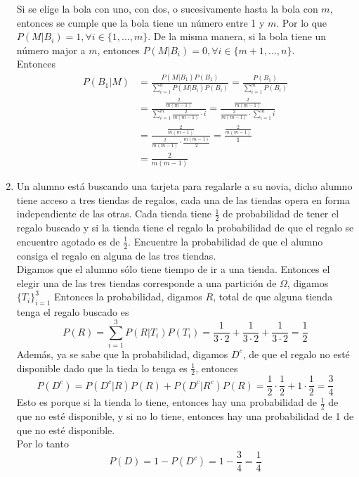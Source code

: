 \documentclass[12pt,a4paper]{report}
\begin{document}
\begin{enumerate}
{\begin{enumerate}[label= \alph*) ]
{		Si se elige la bola con uno, con dos, o sucesivamente hasta la bola con $m$,
		entonces se cumple que la bola tiene un número entre 1 y $m$. Por lo que
		$P(M|B_i) = 1, \forall i \in \{1, ..., m\}$. De la misma manera, si la bola
		tiene un número major a $m$, entonces $P(M|B_i) = 0, \forall i \in \{m+1, ..., n\}$.\\
		Entonces
		\begin{align*}
			P(B_1|M) &= \frac{P(M | B_1)P(B_1)}{\sum_{i = 1}^n P(M|B_i)P(B_i)}
							 = \frac{P(B_1)}{\sum_{i = 1}^m P(B_i)}\\
							 &= \frac{\frac{2}{m(m-1)}}{\sum_{i = 1}^m \frac{2}{m(m-1)}\cdot i}
							 = \frac{\frac{2}{m(m-1)}}{\frac{2}{m(m-1)} \cdot \sum_{i = 1}^m i}\\
							 &= \frac{\frac{2}{m(m-1)}}{\frac{2}{m(m-1)} \cdot \frac{m(m-1)}{2}}
							 = \frac{\frac{2}{m(m-1)}}{1}\\
							 &= \frac{2}{m(m-1)}
		\end{align*}
	}
 \end{enumerate}
  }

  \item{
		Un alumno está buscando una tarjeta para regalarle a su novia,
		dicho alumno tiene acceso a tres tiendas de regalos, cada una de las tiendas
		opera en forma independiente de las otras. Cada tienda tiene $\frac{1}{2}$
		de probabilidad de tener el regalo buscado y si la tienda tiene el regalo la
		probabilidad de que el regalo se encuentre agotado es de $\frac{1}{2}$.
		Encuentre la probabilidad de que el alumno consiga el regalo en alguna de
		las tres tiendas.\\

		Digamos que el alumno sólo tiene tiempo de ir a una tienda. Entonces el elegir
		una de las tres tiendas corresponde a una partición de $\Omega$, digamos $\{T_i\}_{i = 1}^3$
		Entonces la probabilidad, digamos $R$, total de que alguna tienda tenga el regalo buscado es
		\begin{equation*}
			P(R) = \sum_{i = 1}^3 P(R | T_i) P(T_i) = \frac{1}{3 \cdot 2}
			+ \frac{1}{3 \cdot 2} + \frac{1}{3 \cdot 2} = \frac{1}{2}
		\end{equation*}
		Además, ya se sabe que la probabilidad, digamos $D^c$, de que el regalo no esté
		disponible dado que la tieda lo tenga es $\frac{1}{2}$, entonces
		\begin{equation*}
			P(D^c) = P(D^c | R)P(R) + P(D^c | R^c)P(R) = \frac{1}{2} \cdot \frac{1}{2}
			+ 1 \cdot \frac{1}{2} = \frac{3}{4}
		\end{equation*}
		Esto es porque si la tienda lo tiene, entonces hay una probabilidad de
		$\frac{1}{2}$ de que no esté disponible, y si no lo tiene, entonces hay una
		probabilidad de 1 de que no esté disponible. \\
		Por lo tanto
		\begin{equation*}
			P(D) = 1 - P(D^c) = 1 - \frac{3}{4} = \frac{1}{4}
		\end{equation*}
  }






\end{enumerate}
\end{document}
